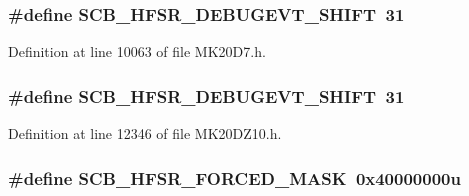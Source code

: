 \subsubsection[{\texorpdfstring{S\+C\+B\+\_\+\+H\+F\+S\+R\+\_\+\+D\+E\+B\+U\+G\+E\+V\+T\+\_\+\+S\+H\+I\+FT}{SCB_HFSR_DEBUGEVT_SHIFT}}]{\setlength{\rightskip}{0pt plus 5cm}\#define S\+C\+B\+\_\+\+H\+F\+S\+R\+\_\+\+D\+E\+B\+U\+G\+E\+V\+T\+\_\+\+S\+H\+I\+FT~31}\hypertarget{group___s_c_b___register___masks_gae21e5892682405886d893868b824824a}{}\label{group___s_c_b___register___masks_gae21e5892682405886d893868b824824a}


Definition at line 10063 of file M\+K20\+D7.\+h.

\subsubsection[{\texorpdfstring{S\+C\+B\+\_\+\+H\+F\+S\+R\+\_\+\+D\+E\+B\+U\+G\+E\+V\+T\+\_\+\+S\+H\+I\+FT}{SCB_HFSR_DEBUGEVT_SHIFT}}]{\setlength{\rightskip}{0pt plus 5cm}\#define S\+C\+B\+\_\+\+H\+F\+S\+R\+\_\+\+D\+E\+B\+U\+G\+E\+V\+T\+\_\+\+S\+H\+I\+FT~31}\hypertarget{group___s_c_b___register___masks_gae21e5892682405886d893868b824824a}{}\label{group___s_c_b___register___masks_gae21e5892682405886d893868b824824a}


Definition at line 12346 of file M\+K20\+D\+Z10.\+h.

\subsubsection[{\texorpdfstring{S\+C\+B\+\_\+\+H\+F\+S\+R\+\_\+\+F\+O\+R\+C\+E\+D\+\_\+\+M\+A\+SK}{SCB_HFSR_FORCED_MASK}}]{\setlength{\rightskip}{0pt plus 5cm}\#define S\+C\+B\+\_\+\+H\+F\+S\+R\+\_\+\+F\+O\+R\+C\+E\+D\+\_\+\+M\+A\+SK~0x40000000u}\hypertarget{group___s_c_b___register___masks_ga7a8e1a0baf849689112d6fc46b69cc66}{}\label{group___s_c_b___register___masks_ga7a8e1a0baf849689112d6fc46b69cc66}


